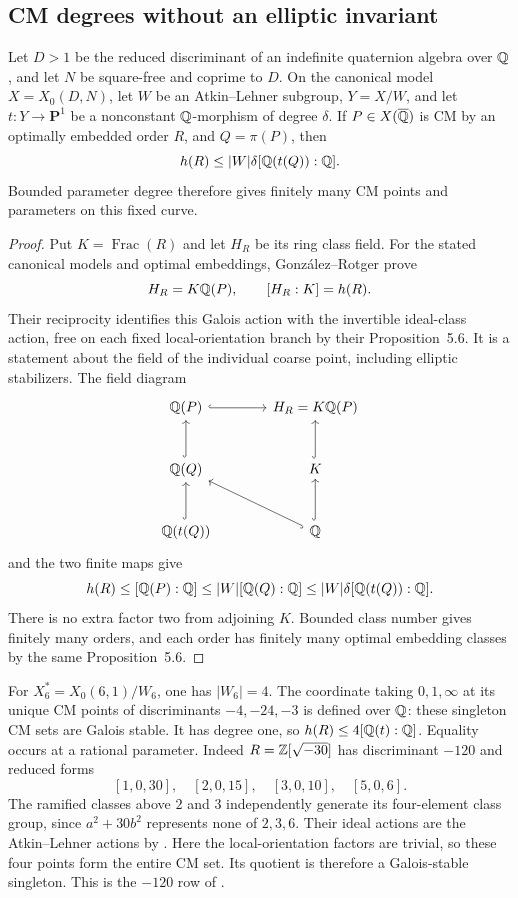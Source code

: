 \subsection{CM degrees without an elliptic invariant}
\label{subsec:compact-class-field}
\begin{proposition}
\label{prop:compact-cm-degree}
Let $D>1$ be the reduced discriminant of an indefinite quaternion
algebra over $\mathbb Q$, and let $N$ be square-free and coprime to $D$.
On the canonical model $X=X_0(D,N)$, let $W$ be an Atkin--Lehner
subgroup, $Y=X/W$, and let $t:Y\to\mathbf P^1$ be a nonconstant
$\mathbb Q$-morphism of degree $\delta$. If $P\in X(\overline{\mathbb Q})$ is CM by
an optimally embedded order $R$, and $Q=\pi(P)$, then
\begin{equation}\label{eq:compact-class-bound}
 h(R)\le |W|\delta[\mathbb Q(t(Q)):\mathbb Q].
\end{equation}
Bounded parameter degree therefore gives finitely many CM points and
parameters on this fixed curve.
\end{proposition}
\begin{proof}
Put $K=\operatorname{Frac}(R)$ and let $H_R$ be its ring class field.
For the stated canonical models and optimal embeddings,
Gonz\'alez--Rotger \cite[Theorem~5.8(1)]{GonzalezRotger} prove
\begin{equation}\label{eq:GR-class-field}
 H_R=K\mathbb Q(P),\qquad [H_R:K]=h(R).
\end{equation}
Their reciprocity identifies this Galois action with the invertible
ideal-class action, free on each fixed local-orientation branch by
their Proposition~5.6. It is a statement about the field of the
individual coarse point, including elliptic stabilizers.
The field diagram
\[
\begin{tikzcd}[column sep=large,row sep=large]
 \Q(P) \arrow[r,hook] & H_R=K\Q(P)\\
 \Q(Q) \arrow[u,hook] & K \arrow[u,hook]\\
 \Q(t(Q)) \arrow[u,hook] & \Q \arrow[u,hook] \arrow[ul,hook]
\end{tikzcd}
\]
and the two finite maps give
\[
 h(R)\le[\mathbb Q(P):\mathbb Q]
       \le|W|[\mathbb Q(Q):\mathbb Q]
       \le|W|\delta[\mathbb Q(t(Q)):\mathbb Q].
\]
There is no extra factor two from adjoining $K$. Bounded class number
gives finitely many orders, and each order has finitely many optimal
embedding classes by the same Proposition~5.6.
\end{proof}

For $X_6^*=X_0(6,1)/W_6$, one has $|W_6|=4$. The coordinate taking
$0,1,\infty$ at its unique CM points of discriminants $-4,-24,-3$
is defined over $\mathbb Q$: these singleton CM sets are Galois stable.
It has degree one, so $h(R)\le4[\mathbb Q(t):\mathbb Q]$. Equality occurs at a
rational parameter. Indeed $R=\mathbb Z[\sqrt{-30}]$ has discriminant
$-120$ and reduced forms
\[
 [1,0,30],\quad[2,0,15],\quad[3,0,10],\quad[5,0,6].
\]
The ramified classes above $2$ and $3$ independently generate its
four-element class group, since $a^2+30b^2$ represents none of
$2,3,6$. Their ideal actions are the Atkin--Lehner actions by
\cite[Lemma~5.9]{GonzalezRotger}. Here the local-orientation factors
are trivial, so these four points form the entire CM set. Its quotient
is therefore a Galois-stable singleton. This is the $-120$ row of
\cite[Theorem~1]{Yang}.

